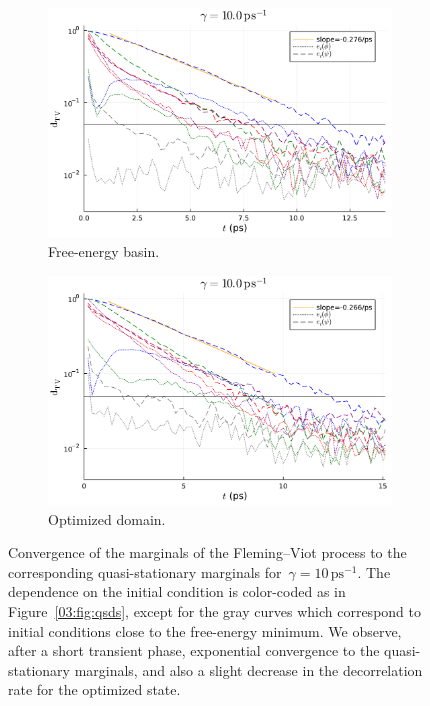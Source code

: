 \begin{figure}
        \centering
        \begin{subfigure}{0.49\textwidth}
        \includegraphics[width=\textwidth]{figures/03/shape_optim_diala/plots_fv/errs_trajectories_basin_10.pdf}
            \caption[]{Free-energy basin.}
            \label{03:fig:decorr_basin}
        \end{subfigure}
        \begin{subfigure}{0.49\textwidth}
            \includegraphics[width=\textwidth]{figures/03/shape_optim_diala/plots_fv/errs_trajectories_opt_10.pdf}
                \caption[]{Optimized domain.}
                \label{03:fig:decorr_opt_domain}
            \end{subfigure}
            \caption[]{Convergence of the marginals of the Fleming--Viot process to the corresponding quasi-stationary marginals for~$\gamma=10\,\mathrm{ps}^{-1}$. The dependence on the initial condition is color-coded as in Figure~\ref{03:fig:qsds}, except for the gray curves which correspond to initial conditions close to the free-energy minimum. We observe, after a short transient phase, exponential convergence to the quasi-stationary marginals, and also a slight decrease in the decorrelation rate for the optimized state.}
        \label{03:fig:decorrelation_fv}
\end{figure}

